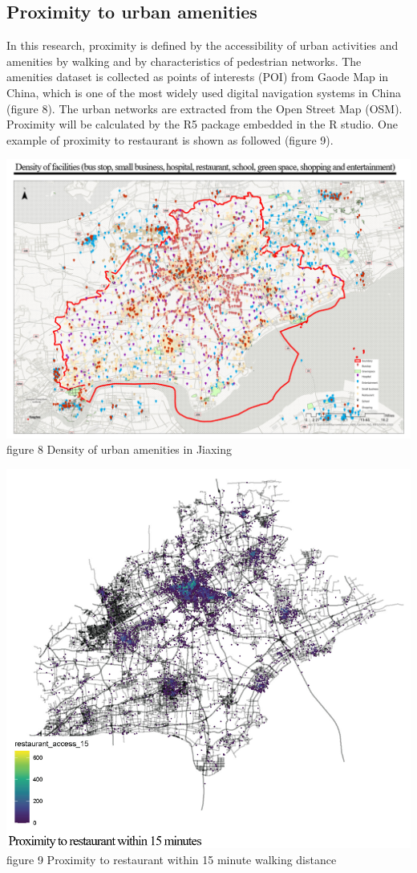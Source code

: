 \documentclass[
]{article}
\begin{document}
\hypertarget{proximity-to-urban-amenities}{%
\subsection{Proximity to urban
amenities}\label{proximity-to-urban-amenities}}

In this research, proximity is defined by the accessibility of urban
activities and amenities by walking and by characteristics of pedestrian
networks. The amenities dataset is collected as points of interests
(POI) from Gaode Map in China, which is one of the most widely used
digital navigation systems in China (figure 8). The urban networks are
extracted from the Open Street Map (OSM). Proximity will be calculated
by the R5 package embedded in the R studio. One example of proximity to
restaurant is shown as followed (figure 9).

\href{https://WTHSYZW.github.io/Thesis_2022/maps/POI.jpg}{\includegraphics{maps/POI.png}}
figure 8 Density of urban amenities in Jiaxing

\href{https://WTHSYZW.github.io/Thesis_2022/maps/proximity.png}{\includegraphics{maps/proximity.png}}
figure 9 Proximity to restaurant within 15 minute walking distance
\end{document}
